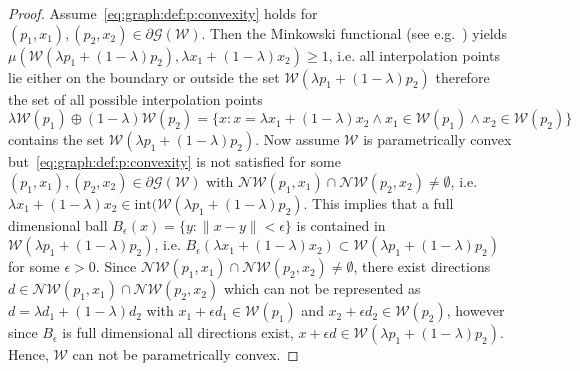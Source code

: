 \begin{proof}
%
Assume~\eqref{eq:graph:def:p:convexity} holds for $(p_1,x_1),(p_2,x_2)\in\partial\mathscr G(\mathcal W)$.
%
Then the Minkowski functional (see e.g.~\cite{Rudin:91}) yields $\mu(\mathcal W(\lambda p_1 + (1-\lambda)p_2),
\lambda x_1+(1-\lambda)x_2)\geq1$,
i.e. all interpolation points lie either on the boundary or outside the set $\mathcal W(\lambda p_1+(1-\lambda)p_2)$
therefore the set of all possible interpolation points 
%
\[
	\lambda \mathcal W(p_1)\oplus (1-\lambda)\mathcal W(p_2) = \{x:x=\lambda x_1 + (1-\lambda) x_2 \wedge x_1\in\mathcal 
	W(p_1) \wedge x_2\in\mathcal W(p_2)\}
\]
%
contains the set $\mathcal W(\lambda p_1 + (1-\lambda)p_2)$.
%
Now assume $\mathcal W$ is parametrically convex but~\eqref{eq:graph:def:p:convexity} is not satisfied for 
some $(p_1,x_1),(p_2,x_2)\in\partial\mathscr G(\mathcal W)$ with $\mathcal N\mathcal W(p_1,x_1)\cap\mathcal 
N\mathcal W(p_2,x_2)\neq\emptyset$, i.e. $\lambda x_1 + (1-\lambda)x_2\in\text{int}(\mathcal W(\lambda p_1 + 
(1-\lambda)p_2)$.
%
This implies that a full dimensional ball $B_\epsilon(x ) = \{y:\| 
x-y\|<\epsilon\}$
is contained in $\mathcal W(\lambda p_1 + (1-\lambda)p_2)$, i.e. $B_\epsilon(\lambda x_1 + (1-\lambda)x_2 )\subset
\mathcal W(\lambda p_1 + (1-\lambda)p_2)$ for some $\epsilon>0$.
%
Since $\mathcal N\mathcal W(p_1,x_1)\cap\mathcal N\mathcal W(p_2,x_2)\neq\emptyset$, there exist directions 
$d\in\mathcal N\mathcal W(p_1,x_1)\cap\mathcal N\mathcal W(p_2,x_2)$ which can not be represented as $d=\lambda d_1+
(1-\lambda)d_2$ with $x_1 + \epsilon d_1\in\mathcal W(p_1)$ and $x_2  + \epsilon d_2\in\mathcal W(p_2)$, however since $B_\epsilon$ is full dimensional
all directions exist, $x+\epsilon d\in\mathcal W(\lambda p_1 + (1-\lambda)p_2)$.
%
Hence, $\mathcal W$ can not be parametrically convex.
\end{proof}

